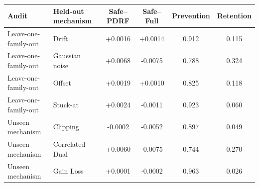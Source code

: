 \begin{tabular}{llcccc}
\toprule
Audit & Held-out mechanism & Safe--PDRF & Safe--Full & Prevention & Retention \\
\midrule
Leave-one-family-out & Drift & +0.0016 & +0.0014 & 0.912 & 0.115 \\
Leave-one-family-out & Gaussian noise & +0.0068 & -0.0075 & 0.788 & 0.324 \\
Leave-one-family-out & Offset & +0.0019 & +0.0010 & 0.825 & 0.118 \\
Leave-one-family-out & Stuck-at & +0.0024 & -0.0011 & 0.923 & 0.060 \\
Unseen mechanism & Clipping & -0.0002 & -0.0052 & 0.897 & 0.049 \\
Unseen mechanism & Correlated Dual & +0.0060 & -0.0075 & 0.744 & 0.270 \\
Unseen mechanism & Gain Loss & +0.0001 & -0.0002 & 0.963 & 0.026 \\
\bottomrule
\end{tabular}
